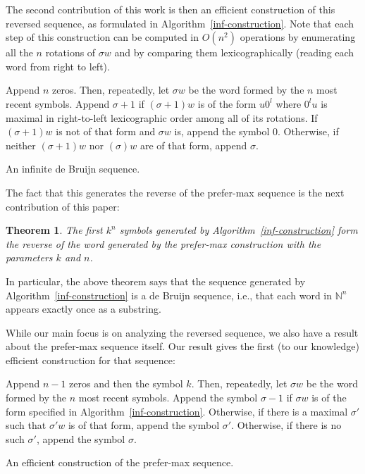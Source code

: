 \documentclass{article}
\newtheorem{theorem}{Theorem}
\theoremstyle{definition}
\newcommand{\N}{{\mathbb{N}}}
\begin{document}
The second contribution of this work is then an efficient construction of this reversed sequence, as formulated in Algorithm~\ref{inf-construction}. Note that each step of this construction can be computed in $O(n^2)$ operations by enumerating all the $n$ rotations of $\sigma w$ and by comparing them lexicographically (reading each word from right to left).


\begin{algorithm}[!h]
	Append $n$ zeros. Then, repeatedly, let $\sigma w$ be the word formed by the $n$ most recent symbols. Append $\sigma+1$ if $(\sigma+1)w$ is of the form $u0^l$ where $0^lu$ is maximal in right-to-left lexicographic order among all of its rotations. If $(\sigma+1)w$ is not of that form and $\sigma w$ is, append the symbol $0$. Otherwise, if neither $(\sigma+1)w$ nor $(\sigma)w$ are of that form, append $\sigma$.
	\caption{An infinite de Bruijn sequence.}
	\label{inf-construction}
\end{algorithm}

The fact that this generates the reverse of the prefer-max sequence is the next contribution of this paper:
 
\begin{theorem} 
The first $k^n$ symbols generated by Algorithm~\ref{inf-construction} form the reverse of the word generated by the prefer-max construction with the parameters $k$ and $n$.	
\end{theorem} 

In particular, the above theorem says that the sequence generated by Algorithm~\ref{inf-construction} is a de Bruijn sequence, i.e., that each word in $\N^n$ appears exactly once as a substring.

While our main focus is on analyzing the reversed sequence, we also have a result about the prefer-max sequence itself. Our result gives the first (to our knowledge) efficient construction for that sequence:

\begin{algorithm}[!h]
	Append $n-1$ zeros and then the symbol $k$. Then, repeatedly, let $\sigma w$ be the word formed by the $n$ most recent symbols. Append the symbol $\sigma-1$  if $\sigma w$  is of the form specified in Algorithm~\ref{inf-construction}. Otherwise, if there is a maximal $\sigma'$ such that $\sigma'w$ is of that form, append the symbol $\sigma'$. Otherwise, if there is no such $\sigma'$, append the symbol $\sigma$.
		
	\caption{An efficient construction of the prefer-max sequence.}
	\label{efficient-pref-max}
\end{algorithm}
\end{document}

